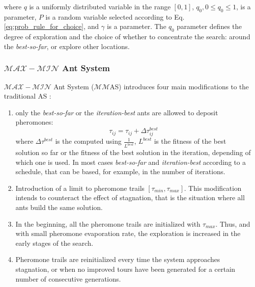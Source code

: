 					\noindent where $q$ is a uniformly distributed variable in the range $[0,1]$, $q_{0}, 0 \leq q_{0} \leq 1$, is a parameter, $P$ is a random variable selected according to Eq. \eqref{eq:prob_rule_for_choice}, and $\gamma$ is a parameter. The $q_{0}$ parameter defines the degree of exploration and the choice of whether to concentrate the search: around the \emph{best-so-far}, or explore other locations.


					\subsubsection*{$\mathcal{MAX}-\mathcal{MIN}$ Ant System}
					$\mathcal{MAX}-\mathcal{MIN}$ Ant System ($\mathcal{MM}$AS) introduces four main modifications to the traditional AS \cite{stutzle00}:
					\begin{enumerate}
						\item only the \emph{best-so-far} or the \emph{iteration-best} ants are allowed to deposit pheromones:
							\begin{equation}
								\label{eq:max_min_rank_pheromone_update}
								\tau_{ij} = \tau_{ij} + \Delta\tau_{ij}^{best}
							\end{equation}
							\noindent where $\Delta\tau^{best}$ is the computed using $\frac{1} {L^{best}}$, ${L^{best}}$ is the fitness of the best solution so far or the fitness of the best solution in the iteration, depending of which one is used. In most cases \emph{best-so-far} and \emph{iteration-best} according to a schedule, that can be based, for example, in the number of iterations.
						
						\item Introduction of a limit to pheromone trails $[\tau_{min},\tau_{max}]$. This modification intends to counteract the effect of stagnation, that is the situation where all ants build the same solution.
						
						\item In the beginning, all the pheromone trails are initialized with $\tau_{max}$. Thus, and with small pheromone evaporation rate, the exploration is increased in the early stages of the search.
						
						\item Pheromone trails are reinitialized every time the system approaches stagnation, or when no improved tours have been generated for a certain number of consecutive generations.
						 					
					\end{enumerate}
		
